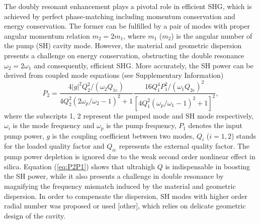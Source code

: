 \documentclass[a4paper,8pt,hyperref, twocolumn]{article}
\begin{document}
The doubly resonant enhancement plays a pivotal role in efficient SHG, which is achieved by perfect phase-matching including momentum conservation and energy conservation.
The former can be fulfilled by a pair of modes with proper angular momentum relation $m_2=2m_1$, where $m_1$ ($m_2$) is the angular number of the pump (SH) cavity mode. 
However, the material and geometric dispersion presents a challenge on energy conservation, obstructing the double resonance $\omega_2=2\omega_1$ and consequently, efficient SHG. 
More accurately, the SH power can be derived from coupled mode equations (see Supplementary Information)%
\begin{equation}
P_2 = \frac{4|g|^2Q_2^2/(\omega_2Q_{1e})}{4Q_2^2(2\omega_p/\omega_2-1)^2+1}\frac{16Q_1^4P_1^2/(\omega_1Q_{2e})^2}{[4Q_1^2(\omega_p/\omega_1-1)^2+1]^2},
\label{eq:P2P1}
\end{equation}
where the subscripts 1, 2 represent the pumped mode and SH mode respectively, $\omega_i$ is the mode frequency and $\omega_p$ is the pump frequency, $P_1$ denotes the input pump power, $g$ is the coupling coefficient between two modes, %
$Q_i$ ($i=1, 2$) stands for the loaded quality factor %
and $Q_{ie}$ represents the external quality factor. The pump power depletion is ignored due to the weak second order nonlinear effect in silica.
Equation (\ref{eq:P2P1}) shows that ultrahigh $Q$ is indispensable in boosting the SH power, while it also presents a challenge in double resonance by magnifying the frequency mismatch induced by the material and geometric dispersion.
In order to compensate the dispersion, SH modes with higher order radial number was proposed or used  \cite{kozyreff2008whispering}[other], which relies on delicate geometric design of the cavity.
\end{document}

